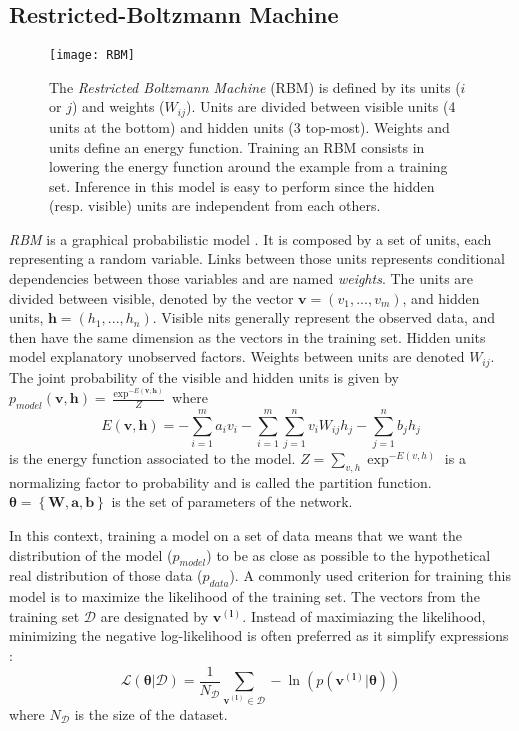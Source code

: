\documentclass[letterpaper]{article}
\begin{document}
\subsection{Restricted-Boltzmann Machine}
\begin{figure}
\centering
\texttt{[image: RBM]}
\caption{The \textit{Restricted Boltzmann Machine} (RBM) is defined by its units ($i$ or $j$) and weights ($W_{ij}$). Units are divided between visible units (4 units at the bottom) and hidden units (3 top-most). Weights and units define an energy function. Training an RBM consists in lowering the energy function around the example from a training set. Inference in this model is easy to perform since the hidden (resp. visible) units are independent from each others.}
\label{fig:RBM}
\end{figure}
\textit{RBM} \cite{hinton2006fast} is a graphical probabilistic model . It is composed by a set of units, each representing a random variable. Links between those units represents conditional dependencies between those variables and are named \textit{weights}. The units are divided between visible, denoted by the vector $\bm{v} = (v_{1},...,v_{m})$, and hidden units, $\bm{h} = (h_{1},...,h_{n})$. Visible nits generally represent the observed data, and then have the same dimension as the vectors in the training set. Hidden units model explanatory unobserved factors.
Weights between units are denoted $W_{ij}$. The joint probability of the visible and hidden units is given by $p_{model}(\bm{v},\bm{h}) = \frac{\exp^{-E(\bm{v},\bm{h})}}{Z}$ where
\begin{equation}
\label{eq:likelihood}
E(\bm{v},\bm{h}) = - \sum_{i=1}^{m} a_{i} v_{i}  - \sum_{i=1}^{m} \sum_{j=1}^{n} v_{i} W_{ij} h_{j} - \sum_{j = 1}^{n} b_{j} h_{j}
\end{equation}
is the energy function associated to the model. $Z = \sum_{v,h}\exp^{-E(v,h)}$ is a normalizing factor to probability and is called the partition function. $\bm{\theta} = \left\lbrace \bm{W} , \bm{a} , \bm{b} \right\rbrace$ is the set of parameters of the network.

In this context, training a model on a set of data means that we want the distribution of the model ($p_{model}$) to be as close as possible to the hypothetical real distribution of those data ($p_{data}$). A commonly used criterion for training this model is to maximize the likelihood of the training set. The vectors from the training set $\mathcal{D}$ are designated by $\bm{v^{(l)}}$.
Instead of maximiazing the likelihood, minimizing the negative log-likelihood is often preferred as it simplify expressions :
\begin{equation}
\mathcal{L(\bm{\theta}|\mathcal{D})}  = \frac{1}{N_{\mathcal{D}}} \sum_{\bm{v^{(l)}} \in \mathcal{D}} - \ln \left( p(\bm{v^{(l)}}|\bm{\theta})\right)
\end{equation}
where $N_{\mathcal{D}}$ is the size of the dataset. 
\end{document}
